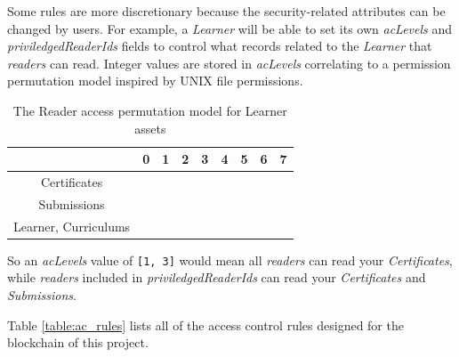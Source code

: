 Some rules are more discretionary because the security-related attributes can be changed by users.
For example, a \textit{Learner} will be able to set its own \textit{acLevels} and \textit{priviledgedReaderIds} fields to control
what records related to the \textit{Learner} that \textit{readers} can read. Integer values are stored in \textit{acLevels} correlating to
a permission permutation model inspired by UNIX file permissions.

\begin{table}[!ht]
	\caption{The Reader access permutation model for Learner assets}
	\centering
	\label{table:reader_permutations}
	\begin{tabular}{|c|c|c|c|c|c|c|c|c|}
		\hline
		                     & 0 & 1          & 2          & 3          & 4          & 5          & 6          & 7          \\
		\hline
		Certificates         &   & \checkmark &            & \checkmark &            & \checkmark &            & \checkmark \\
		\hline
		Submissions          &   &            & \checkmark & \checkmark &            &            & \checkmark & \checkmark \\
		\hline
		Learner, Curriculums &   &            &            &            & \checkmark & \checkmark & \checkmark & \checkmark \\
		\hline
	\end{tabular}
\end{table}

So an \textit{acLevels} value of \texttt{[1, 3]} would mean all \textit{readers} can read your \textit{Certificates},
while \textit{readers} included in \textit{priviledgedReaderIds} can read your \textit{Certificates} and \textit{Submissions}.

Table \ref{table:ac_rules} lists all of the access control rules designed for the blockchain of this project.

